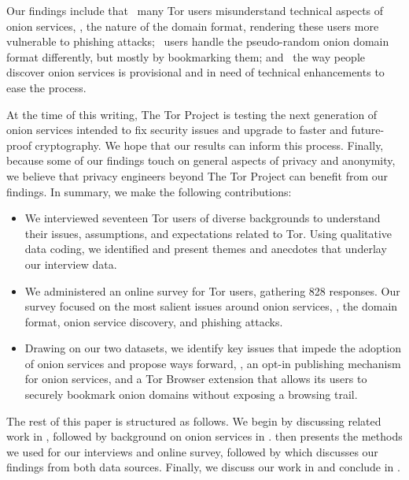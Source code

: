 Our findings include that \first~many Tor users misunderstand technical aspects
of onion services, \eg, the nature of the domain format, rendering these users
more vulnerable to phishing attacks; \second~users handle the pseudo-random
onion domain format differently, but mostly by bookmarking them; and \third~the
way people discover onion services is provisional and in need of technical
enhancements to ease the process.

At the time of this writing, The Tor Project is testing the next generation of
onion services intended to fix security issues and upgrade to faster and
future-proof cryptography.  We hope that our results can inform this process.
Finally, because some of our findings touch on general aspects of privacy and
anonymity, we believe that privacy engineers beyond The Tor Project can benefit
from our findings.  In summary, we make the following contributions:

\begin{itemize}
    \item We interviewed seventeen Tor users of diverse backgrounds to
        understand their issues, assumptions, and expectations related to Tor.
        Using qualitative data coding, we identified and present themes and
        anecdotes that underlay our interview data.

    \item We administered an online survey for Tor users, gathering 828
        responses.  Our survey focused on the most salient issues around onion
        services, \ie, the domain format, onion service discovery, and phishing
        attacks.

    \item Drawing on our two datasets, we identify key issues that impede the
        adoption of onion services and propose ways forward, \eg, an opt-in
        publishing mechanism for onion services, and a Tor Browser extension
        that allows its users to securely bookmark onion domains without
        exposing a browsing trail.
\end{itemize}

The rest of this paper is structured as follows.  We begin by discussing related
work in , followed by background on onion services in
.   then presents the methods we used for
our interviews and online survey, followed by  which discusses
our findings from both data sources.  Finally, we discuss our work in
 and conclude in .
